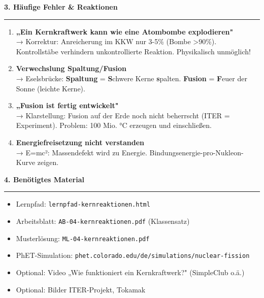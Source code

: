 \documentclass[11pt, a4paper]{article}
\newcommand{\abschnitt}[1]{%
    \vspace{10pt}\noindent\textbf{\textcolor{physik}{\large #1}}\vspace{6pt}\hrule\vspace{8pt}
}
\begin{document}
\vspace{12pt}

\abschnitt{3. Häufige Fehler \& Reaktionen}

\begin{warnbox}
\begin{enumerate}
\item \textbf{„Ein Kernkraftwerk kann wie eine Atombombe explodieren"}\\
→ Korrektur: Anreicherung im KKW nur 3-5\% (Bombe >90\%). Kontrollstäbe verhindern unkontrollierte Reaktion. Physikalisch unmöglich!

\item \textbf{Verwechslung Spaltung/Fusion}\\
→ Eselsbrücke: \textbf{Spaltung} = \textbf{S}chwere Kerne \textbf{s}palten. \textbf{Fusion} = \textbf{F}euer der Sonne (leichte Kerne).

\item \textbf{„Fusion ist fertig entwickelt"}\\
→ Klarstellung: Fusion auf der Erde noch nicht beherrscht (ITER = Experiment). Problem: 100 Mio. °C erzeugen und einschließen.

\item \textbf{Energiefreisetzung nicht verstanden}\\
→ E=mc²: Massendefekt wird zu Energie. Bindungsenergie-pro-Nukleon-Kurve zeigen.
\end{enumerate}
\end{warnbox}

\vspace{12pt}

\abschnitt{4. Benötigtes Material}

\begin{itemize}
\item Lernpfad: \texttt{lernpfad-kernreaktionen.html}
\item Arbeitsblatt: \texttt{AB-04-kernreaktionen.pdf} (Klassensatz)
\item Musterlösung: \texttt{ML-04-kernreaktionen.pdf}
\item PhET-Simulation: \texttt{phet.colorado.edu/de/simulations/nuclear-fission}
\item Optional: Video „Wie funktioniert ein Kernkraftwerk?" (SimpleClub o.ä.)
\item Optional: Bilder ITER-Projekt, Tokamak
\end{itemize}
\end{document}
